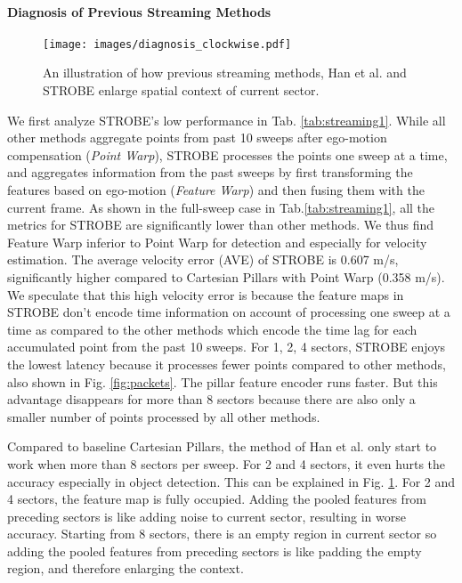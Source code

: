 \documentclass{article}
\begin{document}
\paragraph{Diagnosis of Previous Streaming Methods}\label{discussion}

 \begin{figure}
  \centering 
\texttt{[image: images/diagnosis\_clockwise.pdf]}
  \caption{An illustration of how previous streaming methods, Han et al.\cite{han2020streaming} and STROBE\cite{frossard2020strobe} enlarge spatial context of current sector.  }\label{fig:diagnosis}
\end{figure}
We first analyze STROBE's low performance in Tab. \ref{tab:streaming1}. While all other methods aggregate points from past 10 sweeps after ego-motion compensation (\textit{Point Warp}), STROBE processes the points one sweep at a time, and aggregates information from the past sweeps by first transforming the features based on ego-motion (\textit{Feature Warp}) and then fusing them with the current frame. As shown in the full-sweep case in Tab.\ref{tab:streaming1}, all the metrics for STROBE are significantly lower than other methods. We thus find Feature Warp inferior to Point Warp for detection and especially for velocity estimation. The average velocity error (AVE)\cite{caesar2019nuscenes} of STROBE is 0.607 m/s, significantly higher compared to Cartesian Pillars with Point Warp (0.358 m/s). We speculate that this high velocity error is because the feature maps in STROBE don't encode time information on account of processing one sweep at a time as compared to the other methods which encode the time lag for each accumulated point from the past 10 sweeps. For 1, 2, 4 sectors, STROBE enjoys the lowest latency because it processes fewer points compared to other methods, also shown in Fig. \ref{fig:packets}. The pillar feature encoder runs faster. But this advantage disappears for more than 8 sectors because there are also only a smaller number of points processed by all other methods.


Compared to baseline Cartesian Pillars, the method of Han et al. only start to work when more than 8 sectors per sweep. For 2 and 4 sectors, it even hurts the accuracy especially in object detection. This can be explained in Fig. \ref{fig:diagnosis}. For 2 and 4 sectors, the feature map is fully occupied. Adding the pooled features from preceding sectors is like adding noise to current sector, resulting in worse accuracy. Starting from 8 sectors, there is an empty region in current sector so adding the pooled features from preceding sectors is like padding the empty region, and therefore enlarging the context.
\end{document}
